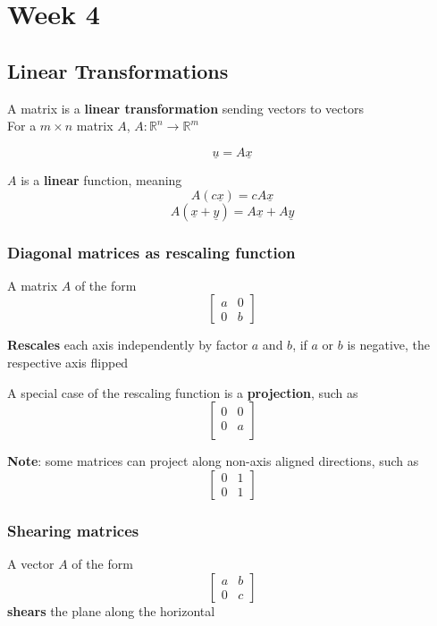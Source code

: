 \chapter{Week 4}

\section{Linear Transformations}

\begin{framed}
   A matrix is a \textbf{linear transformation} sending vectors to vectors \\

   For a $m \times n$ matrix $A$, $A: \mathbb{R}^n \to \mathbb{R}^m$

   \[
     \underline{u} = A \underline{x}
   \] 

   $A$ is a \textbf{linear} function, meaning
   \[
     A(c \underline{x}) = c A \underline{x}
   \] 
   \[
     A( \underline{x} + \underline{y}) = A \underline{x} + A \underline{y}
   \] 
\end{framed}

\subsection{Diagonal matrices as rescaling function}
\begin{framed}
   A matrix $A$ of the form \[
     \begin{bmatrix} 
      a & 0 \\ 0 & b  
     \end{bmatrix}
   \] 

   \textbf{Rescales }each axis independently by factor $a$ and $b$, if $a$ or $b$ is negative, the respective axis flipped

   A special case of the rescaling function is a \textbf{projection}, such as \[
     \begin{bmatrix} 
        0 & 0 \\ 0 & a\\  
     \end{bmatrix}
   \] 

   \textbf{Note}: some matrices can project along non-axis aligned directions, such as \[
     \begin{bmatrix} 
        0 & 1 \\ 0 & 1  
     \end{bmatrix}
   \] 
\end{framed}

\subsection{Shearing matrices}
\begin{framed}
   A vector $A$ of the form \[
     \begin{bmatrix} 
        a & b \\ 0 & c  
     \end{bmatrix}
   \] 
   \textbf{shears} the plane along the horizontal
\end{framed}

